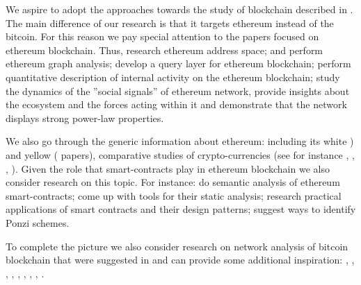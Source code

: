 We aspire to adopt the approaches towards the study of blockchain described in \cite{lischke2016analyzing}. The main difference of our research is that it targets ethereum instead of the bitcoin. For this reason we pay special attention to the papers focused on ethereum blockchain. Thus,  \cite{payette2017characterizing} research ethereum address space;  \cite{chan2017ethereum} and  \cite{chen2018understanding} perform ethereum graph analysis;  \cite{li2017etherql} develop a query layer for ethereum blockchain;  \cite{anoaica2018quantitative} perform quantitative description of internal activity on the ethereum blockchain;  \cite{somin2018social} study the dynamics of the ”social signals” of ethereum network, provide insights about the ecosystem and the forces acting within it and demonstrate that the network displays strong power-law properties. 

We also go through the generic information about ethereum: including its white  \cite{buterin2014next}) and yellow (\cite{wood2014ethereum} papers), comparative studies of crypto-currencies (see for instance  \cite{maesa2018blockchain},  \cite{rudlang2017comparative},  \cite{sapuric2017distributed},  \cite{anderson2016new}). Given the role that smart-contracts play in ethereum blockchain we also consider research on this topic. For instance:  \cite{grishchenko2018semantic} do semantic analysis of ethereum smart-contracts;  \cite{tikhomirov2018smartcheck} come up with tools for their static analysis;  \cite{bartoletti2017dissecting} research practical applications of smart contracts and their design patterns;  \cite{bartoletti2017dissecting} suggest ways to identify Ponzi schemes.

To complete the picture we also consider research on network analysis of bitcoin blockchain that were suggested in  \cite{lischke2016analyzing} and can provide some additional inspiration:  \cite{reid2013analysis},  \cite{baumann2014exploring},  \cite{drainville2012analysis},  \cite{ober2013structure},  \cite{meiklejohn2013fistful},  \cite{spagnuolo2014bitiodine},  \cite{androulaki2013evaluating},  \cite{kaminsky2011black},  \cite{ortega2013bitcoin}.
